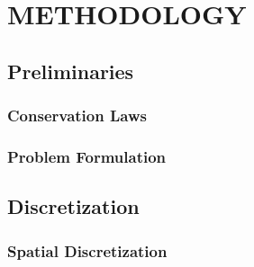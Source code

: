 \chapter{METHODOLOGY}

\section{Preliminaries}
  \subsection{Conservation Laws}
    
  \subsection{Problem Formulation}
    
\section{Discretization}
  \subsection{Spatial Discretization}\label{sec:spatial_discretization}
    
%      
%      
%      
  
